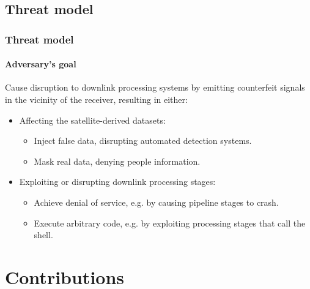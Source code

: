 \documentclass{beamer}
\begin{document}
\subsection{Threat model}
\begin{frame}
  \frametitle{Threat model}
  \framesubtitle{Adversary's goal}
  Cause disruption to downlink processing systems by emitting counterfeit signals in the vicinity of the receiver, resulting in either:
  \newline

  \begin{itemize}
    \item Affecting the satellite-derived datasets:
    \begin{itemize}
      \item Inject false data, disrupting automated detection systems.
      \item Mask real data, denying people information.
    \end{itemize}
    \item Exploiting or disrupting downlink processing stages:
    \begin{itemize}
      \item Achieve denial of service, e.g. by causing pipeline stages to crash.
      \item Execute arbitrary code, e.g. by exploiting processing stages that call the shell.
    \end{itemize}
  \end{itemize}
\end{frame}

\section{Contributions}
\end{document}
